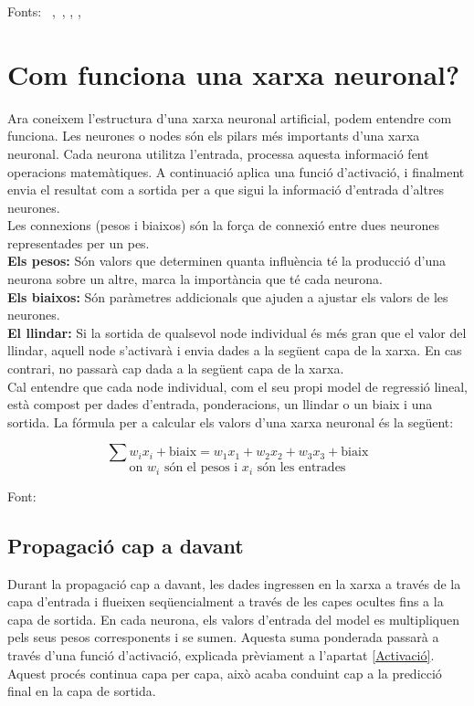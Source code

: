Fonts: ~\cite{Hidden_layer},~\cite{Jacar}, \cite{FuncioD'activacio}, \cite{Softmax}, \cite{datacamp}

\section{Com funciona una xarxa neuronal?}\label{sec:3.8}

Ara coneixem l'estructura d'una xarxa neuronal artificial, podem entendre com funciona. Les neurones o nodes són els pilars més importants d'una xarxa neuronal. Cada neurona utilitza l'entrada, processa aquesta informació fent operacions matemàtiques. A continuació aplica una funció d'activació, i finalment envia el resultat com a sortida per a que sigui la informació d'entrada d'altres neurones.\\[0.2cm]
Les connexions (pesos i biaixos) són la força de connexió entre dues neurones representades per un pes.\\[0.2cm]
\textbf{Els pesos:} Són valors que determinen quanta influència té la producció d'una neurona sobre un altre, marca la importància que té cada neurona.\\[0.3cm]
\textbf{Els biaixos:} Són paràmetres addicionals que ajuden a ajustar els valors de les neurones.\\[0.3cm]
\textbf{El llindar:} Si la sortida de qualsevol node individual és més gran que el valor del llindar, aquell node s'activarà i envia dades a la següent capa de la xarxa. En cas contrari, no passarà cap dada a la següent capa de la xarxa.\\[0.3cm]
Cal entendre que cada node individual, com el seu propi model de regressió lineal, està compost per dades d'entrada, ponderacions, un llindar o un biaix i una sortida. La fórmula per a calcular els valors d'una xarxa neuronal és la següent:

$$
\sum w_i x_i + \text{biaix} = w_1 x_1 + w_2 x_2 + w_3 x_3 + \text{biaix}$$
$$\text{on } w_i \text{ són el pesos i } x_i\text{ són les entrades}
$$

Font: \cite{IMB_Xarxa_neuronal}
\subsection{Propagació cap a davant}\label{subsec:propagació}
Durant la propagació cap a davant, les dades ingressen en la xarxa a través de la capa d'entrada i flueixen seqüencialment a través de les capes ocultes fins a la capa de sortida. En cada neurona, els valors d'entrada del model es multipliquen pels seus pesos corresponents i se sumen. Aquesta suma ponderada passarà a través d'una funció d'activació, explicada prèviament a l'apartat \ref{Activació}. Aquest procés continua capa per capa, això acaba conduint cap a la predicció final en la capa de sortida.

